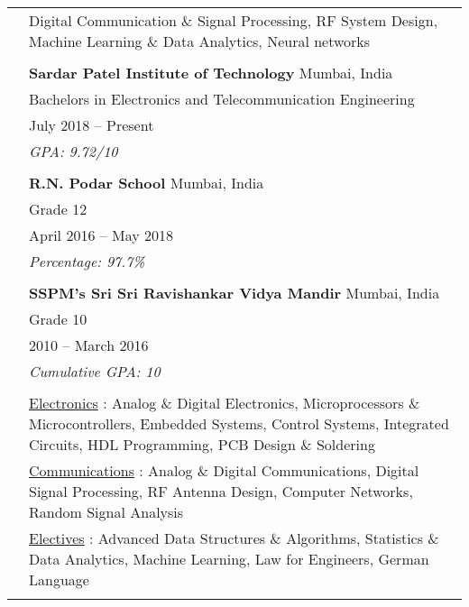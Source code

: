 \documentclass[letterpaper, 11pt]{article}
\begin{document}
\begin{longtable}{p{1.3in}p{4.8in}}


\nohyphens{\color{OliveGreen}{Research interests}}
& Digital Communication \& Signal Processing, RF System Design, Machine Learning \& Data Analytics, Neural networks \\
& \\


\color{OliveGreen}{Education} 
& \textbf{Sardar Patel Institute of Technology} \hfill Mumbai, India \\ 
& Bachelors in Electronics and Telecommunication Engineering \\
& July 2018 -- Present \\
& {\it GPA: 9.72/10}\\
& \\

& \textbf{R.N. Podar School} \hfill Mumbai, India \\
& Grade 12\\
& April 2016 -- May 2018\\
& {\it Percentage: 97.7\%}\\
& \\

& \textbf{SSPM's Sri Sri Ravishankar Vidya Mandir} \hfill Mumbai, India\\
& Grade 10 \\
& 2010 -- March 2016 \\
& {\it Cumulative GPA: 10}\\
& \\

\color{OliveGreen}{Coursework}
& \underline{Electronics} : Analog \& Digital Electronics, Microprocessors 
\& Microcontrollers, Embedded Systems, Control Systems, Integrated Circuits, HDL Programming, PCB Design \& Soldering \\

& \underline{Communications} : Analog \& Digital Communications, Digital Signal Processing, RF Antenna Design, Computer Networks, Random Signal Analysis \\

& \underline{Electives} : Advanced Data Structures \& Algorithms, Statistics \& Data Analytics, Machine Learning, Law for Engineers, German Language\\
 \\


\end{longtable}
\end{document}
